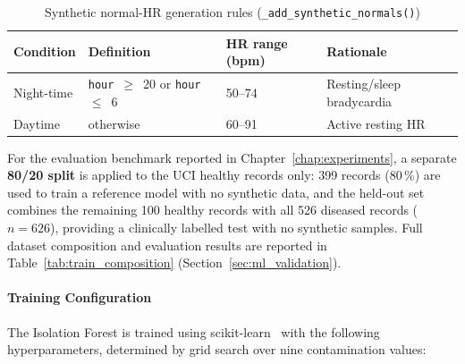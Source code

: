 \begin{table}[H]
\centering
\caption[Synthetic normal-HR generation rules]{Synthetic normal-HR generation rules (\texttt{\_add\_synthetic\_normals()})}
\label{tab:synth_hr_ranges}
\small
\begin{tabular}{llll}
\toprule
\textbf{Condition} & \textbf{Definition} & \textbf{HR range (bpm)} & \textbf{Rationale} \\
\midrule
Night-time & \texttt{hour}~$\geq$~20 or \texttt{hour}~$\leq$~6 & 50--74 & Resting/sleep bradycardia \\
Daytime    & otherwise                                          & 60--91 & Active resting HR         \\
\bottomrule
\end{tabular}
\end{table}

For the evaluation benchmark reported in Chapter~\ref{chap:experiments}, a separate
\textbf{80/20 split} is applied to the UCI healthy records only: 399 records (80\,\%) are used
to train a reference model with no synthetic data, and the held-out set combines the
remaining 100 healthy records with all 526 diseased records ($n=626$), providing a
clinically labelled test with no synthetic samples. Full dataset composition and
evaluation results are reported in Table~\ref{tab:train_composition} (Section~\ref{sec:ml_validation}).

\paragraph{Training Configuration}

The Isolation Forest is trained using scikit-learn~\cite{Pedregosa2011} with the following
hyperparameters, determined by grid search over nine contamination values:

